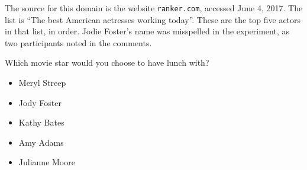 The source for this domain is the website \texttt{ranker.com}, accessed June 4, 2017.
The list is ``The best American actresses working today''.
These are the top five actors in that list, in order.
Jodie Foster's name was misspelled in the experiment, as two participants noted in the comments.

\begin{tcolorbox}
Which movie star would you choose to have lunch with?

\begin{itemize}
	\setlength\itemsep{-5pt}
	\item Meryl Streep
	\item Jody Foster
	\item Kathy Bates
	\item Amy Adams
	\item Julianne Moore
\end{itemize}
\end{tcolorbox}
